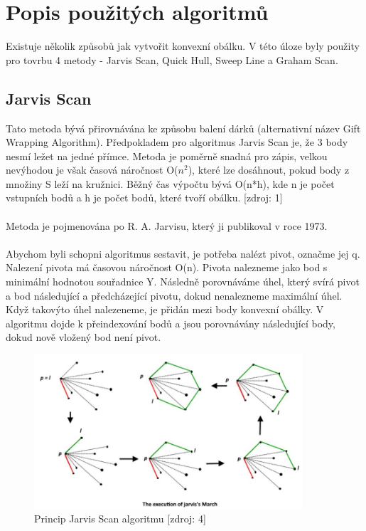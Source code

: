 \documentclass[a4paper, 12pt]{article}
\begin{document}
\section{Popis použitých algoritmů}
Existuje několik způsobů jak vytvořit konvexní obálku. V této úloze byly použity pro tovrbu 4 metody - Jarvis Scan, Quick Hull, Sweep Line a Graham Scan.

\subsection{Jarvis Scan}
Tato metoda bývá přirovnávána ke způsobu balení dárků (alternativní název Gift Wrapping Algorithm). Předpokladem pro algoritmus Jarvis Scan je, že 3 body nesmí ležet na jedné přímce. Metoda je poměrně snadná pro zápis, velkou nevýhodou je však časová náročnost O($n^2$), které lze dosáhnout, pokud body z množiny S leží na kružnici. Běžný čas výpočtu bývá O(n*h), kde n je počet vstupních bodů a h je počet bodů, které tvoří obálku. [zdroj: 1]\\
\\
Metoda je pojmenována po R. A. Jarvisu, který ji publikoval v roce 1973. \\
\\
Abychom byli schopni algoritmus sestavit, je potřeba nalézt pivot, označme jej q. Nalezení pivota má časovou náročnost O(n). Pivota nalezneme jako bod s minimální hodnotou souřadnice Y. Následně porovnáváme úhel, který svírá pivot a bod následující a předcházející pivotu, dokud nenalezneme maximální úhel. Když takovýto úhel nalezeneme, je přidán mezi body konvexní obálky. V algoritmu dojde k přeindexování bodů a jsou porovnávány následující body, dokud nově vložený bod není pivot. 

\begin{figure}[h!]
	\centering
	\includegraphics[width=10cm]{jarvis.jpg}
	\caption{Princip Jarvis Scan algoritmu [zdroj: 4]}
\end{figure}
\end{document}
